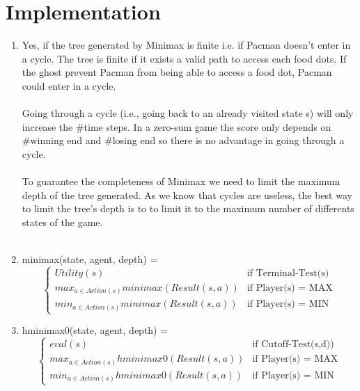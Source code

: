 \documentclass{article}
\begin{document}
\section{Implementation}

\begin{enumerate}[label=\alph*.,leftmargin=*]
    \item Yes, if the tree generated by Minimax is finite i.e. if Pacman doesn't enter in a cycle. The tree is finite if it exists a valid path to access each food dots. If the ghost prevent Pacman from being able to access a food dot, Pacman could enter in a cycle.
    \\
    \\
    Going through a cycle (i.e., going back to an already visited state s) will only increase the \#time steps. In a zero-sum game the score only depends on \#winning end and  \#losing end so there is no advantage in going through a cycle.
    \\
    \\
    To guarantee the completeness of Minimax we need to limit the maximum depth of the tree generated. As we know that cycles are useless, the best way to limit the tree's depth is to to limit it to the maximum number of differents states of the game.
    \\
    \\
    \item minimax(state, agent, depth) =
    \\
    \begin{equation}
    \begin{cases}
      Utility(s) & \text{if Terminal-Test(s}) \\
      max_{a \in Action(s)}minimax(Result(s,a)) & \text{if Player(s) = MAX}\\
      min_{a \in Action(s)}minimax(Result(s,a)) & \text{if Player(s) = MIN}
    \end{cases}
  \end{equation}
    \item hminimax0(state, agent, depth) =
    \\
    \begin{equation}
    \begin{cases}
      eval(s) & \text{if Cutoff-Test(s,d)}) \\
      max_{a \in Action(s)}hminimax0(Result(s,a)) & \text{if Player(s) = MAX}\\
      min_{a \in Action(s)}hminimax0(Result(s,a)) & \text{if Player(s) = MIN}
    \end{cases}

\end{equation}
\end{enumerate}
\end{document}

